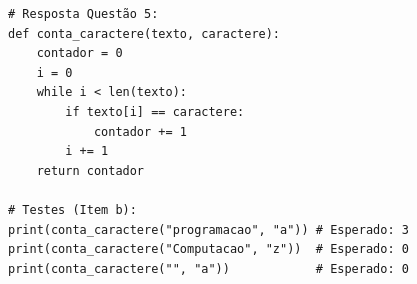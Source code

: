 \ifmostrarGabarito
\begin{verbatim}
# Resposta Questão 5:
def conta_caractere(texto, caractere):
    contador = 0
    i = 0
    while i < len(texto):
        if texto[i] == caractere:
            contador += 1
        i += 1
    return contador

# Testes (Item b):
print(conta_caractere("programacao", "a")) # Esperado: 3
print(conta_caractere("Computacao", "z"))  # Esperado: 0
print(conta_caractere("", "a"))            # Esperado: 0
\end{verbatim}
\fi
